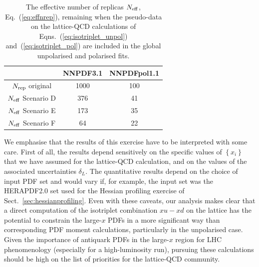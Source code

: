 \begin{table}[h!]
  \centering
  \renewcommand{\arraystretch}{1.3} 
  \begin{tabular}{c|c|c}
    \hline
    &  NNPDF3.1  &  NNPDFpol1.1 \\
    \hline
    \hline
    $N_{\rm rep}$ original   &   1000 &  100   \\
    \hline
     $N_{\rm eff}$ Scenario D    &   376  &  41   \\
     $N_{\rm eff}$ Scenario E    &   173   &   35  \\
     $N_{\rm eff}$ Scenario F   &   64  &   22  \\
    \hline
  \end{tabular}
  \caption{\small The effective number of replicas
    $N_{\rm eff}$, Eq.~(\ref{eq:effnrep}), remaining when the pseudo-data
    on the lattice-QCD calculations
    of Eqns.~(\ref{eq:isotriplet_unpol})
and~(\ref{eq:isotriplet_pol}) 
   are included in the global
    unpolarised and polarised fits. 
    \label{tab:neffxspace}
  }
\end{table}

We emphasise that
the results of this exercise have to be interpreted
with some care.
%
First of all, the results depend sensitively on the specific values of
$\left\{ x_i \right\}$
that we have assumed for the lattice-QCD calculation,
and on the values
of the associated uncertainties $\delta_L$.
%
The quantitative results depend on the choice of input PDF set and would 
vary if, for example, the input set was the HERAPDF2.0 set used for the 
Hessian profiling exercise of Sect.~\ref{sec:hessianprofiling}.
%
Even with these caveats, our analysis makes clear that a direct
computation of the isotriplet combination $x u-x d$ on the lattice
has the potential to constrain the large-$x$ PDFs in
a more significant way than corresponding PDF moment calculations,
particularly in the unpolarised case.
%
Given the importance of antiquark PDFs in the large-$x$ region for LHC phenomenology
(especially for a high-luminosity run), 
pursuing these calculations should be high on the list
of priorities for the lattice-QCD community.


